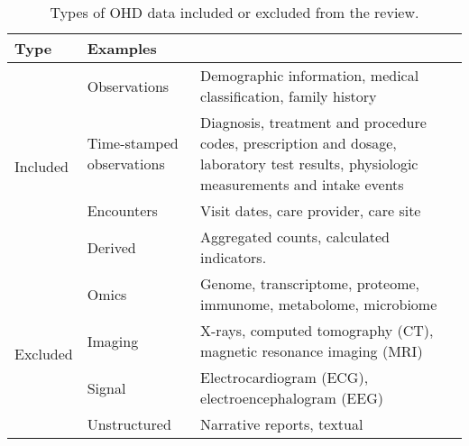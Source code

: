 \begin{table}[h]
\center
\footnotesize
  \caption{Types of OHD data included or excluded from the review.}\label{tab:datatypes}
  
  \begin{tabularx}{\textwidth}{@{} p{}Xp{}@{}}\toprule
  Type & Examples \\ \midrule
  
  \multirow{4}{*}{Included} & Observations & Demographic information, medical classification, family history \\
  
  &Time-stamped observations & Diagnosis, treatment and procedure codes, prescription and dosage, laboratory test results, physiologic measurements and intake events \\
  &Encounters & Visit dates, care provider, care site \\
  &Derived & Aggregated counts, calculated indicators. \\ \midrule

  \multirow{4}{*}{Excluded} & Omics & Genome, transcriptome, proteome, immunome, metabolome, microbiome \\
  &Imaging & X-rays, computed tomography (CT), magnetic resonance imaging (MRI) \\
  &Signal & Electrocardiogram (ECG), electroencephalogram (EEG) \\
  &Unstructured & Narrative reports, textual \\ \bottomrule
  \end{tabularx}%
\end{table}